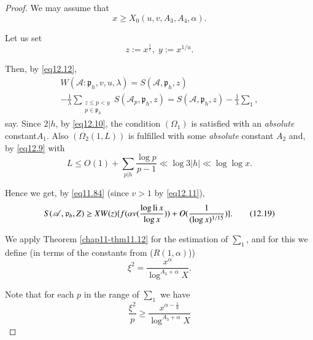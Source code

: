 \begin{proof}
We may assume that
\begin{equation*}
x \geq X_0(u,v,A_3,A_4, \alpha). \tag{12.15}\label{eq12.15}
\end{equation*}

Let us set
\begin{equation*}
z:=x^{\frac{1}{v}}, \; y:=x^{1/u}. \tag{12.16}\label{eq12.16}
\end{equation*}

Then, by \eqref{eq12.12},
\begin{gather*}
W(\mathscr{A}:\mathfrak{p}_h,v,u,\lambda)=S(\mathscr{A},
\mathfrak{p}_h,z)\\
-\frac{1}{\lambda} \sum_{\substack{z \leq p < y \\ p
    \in \mathfrak{p}_h}} S(\mathscr{A}_p,
\mathfrak{p}_h,z)=S(\mathscr{A}, \mathfrak{p}_h,z)-\frac{1}{\lambda}
\sum_1, \tag{12.17}\label{eq12.17} 
\end{gather*}
say. Since $2 |h$, by \eqref{eq12.10}, the condition $(\Omega_1)$ is
satisfied with an \textit{absolute} constant\pageoriginale $A_1$. Also
$(\Omega_2(1,L))$ is fulfilled with some \textit{absolute} constant
$A_2$ and, by \eqref{eq12.9} with 
\begin{equation*}
L \leq O(1)+\sum_{p|h}\frac{\log p}{p-1} \ll \log 3|h| \ll \log \log
x. \tag{12.18}\label{eq12.18} 
\end{equation*}

Hence we get, by \eqref{eq11.84} (since $v>1 $ by \eqref{eq12.11}),
\begin{equation*}
S(\mathscr{A}, \mathfrak{p}_h,Z) \geq X W(z)\{f( \alpha v(\frac{\log
  \operatorname{li} x}{\log x}))+O(\frac{1}{(\log
  x)^{1/15}})\}. \tag{12.19}\label{eq12.19}  
\end{equation*}

We apply Theorem \ref{chap11-thm11.12} for the estimation of $\sum_1$,
and for this we define (in terms of the constants from ($R(1,
\alpha)$)) 
\begin{equation*}
\xi^2= \frac{x^{\alpha}}{\log ^{A_3+\alpha}X}. \tag{12.20}\label{eq12.20}
\end{equation*}

Note that for each $p$ in the range of $\sum_1$ we have
\begin{equation*}
\frac{\xi^2}{p} \geq \frac{x^{\alpha - \frac{1}{u}}}{\log ^{A_3+
    \alpha}X} \tag{12.21}\label{eq12.21} 
\end{equation*}


\end{proof}
